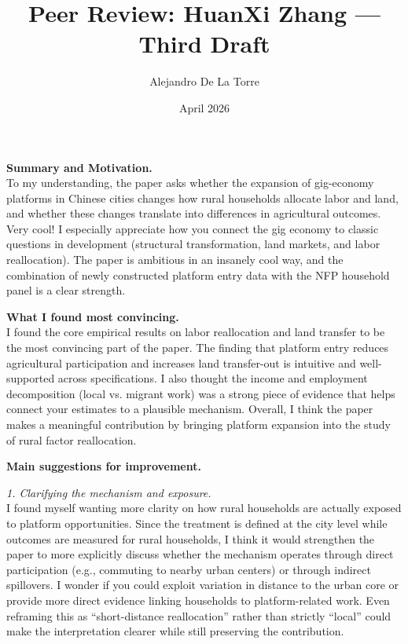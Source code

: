 \documentclass[12pt]{article}
\title{Peer Review: HuanXi Zhang --- Third Draft}
\author{Alejandro De La Torre}
\date{April 2026}
\begin{document}
\maketitle

\singlespacing

\noindent \textbf{Summary and Motivation.} \\
To my understanding, the paper asks whether the expansion of gig-economy platforms in Chinese cities changes how rural households allocate labor and land, and whether these changes translate into differences in agricultural outcomes. Very cool! I especially appreciate how you connect the gig economy to classic questions in development (structural transformation, land markets, and labor reallocation). The paper is ambitious in an insanely cool way, and the combination of newly constructed platform entry data with the NFP household panel is a clear strength.

\vspace{0.5em}
\noindent \textbf{What I found most convincing.} \\
I found the core empirical results on labor reallocation and land transfer to be the most convincing part of the paper. The finding that platform entry reduces agricultural participation and increases land transfer-out is intuitive and well-supported across specifications. I also thought the income and employment decomposition (local vs. migrant work) was a strong piece of evidence that helps connect your estimates to a plausible mechanism. Overall, I think the paper makes a meaningful contribution by bringing platform expansion into the study of rural factor reallocation.

\vspace{0.5em}
\noindent \textbf{Main suggestions for improvement.}

\textit{1. Clarifying the mechanism and exposure.} \\
I found myself wanting more clarity on how rural households are actually exposed to platform opportunities. Since the treatment is defined at the city level while outcomes are measured for rural households, I think it would strengthen the paper to more explicitly discuss whether the mechanism operates through direct participation (e.g., commuting to nearby urban centers) or through indirect spillovers. I wonder if you could exploit variation in distance to the urban core or provide more direct evidence linking households to platform-related work. Even reframing this as “short-distance reallocation” rather than strictly “local” could make the interpretation clearer while still preserving the contribution.
\end{document}
